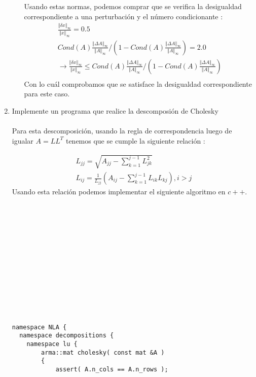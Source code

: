 \documentclass{article}
\begin{document}
\begin{enumerate}
\begin{itemize}
Usando estas normas, podemos comprar que se verifica la desigualdad correspondiente a una perturbaci\'on y el n\'umero condicionante :
\begin{gather*}
\frac{ \Vert \delta x \Vert_{\infty} }{\Vert x \Vert_{\infty}} = 0.5 \\
Cond(A) \frac{ \Vert \Delta A \Vert_{\infty} }{ \Vert A \Vert_{\infty} } /
( 1 - Cond(A) \frac{ \Vert \Delta A \Vert_{\infty} }{ \Vert A \Vert_{\infty} } 	) =  2.0 \\
\rightarrow 
\frac{ \Vert \delta x \Vert_{\infty} }{\Vert x \Vert_{\infty}}
\leq
Cond(A) \frac{ \Vert \Delta A \Vert_{\infty} }{ \Vert A \Vert_{\infty} } /
( 1 - Cond(A) \frac{ \Vert \Delta A \Vert_{\infty} }{ \Vert A \Vert_{\infty} } 	)\\
\end{gather*}
Con lo cu\'al comprobamos que se satisface la desigualdad correspondiente para este caso.
\\
\end{itemize}
\item Implemente un programa que realice la descomposi\'on de Cholesky
\\
\\
Para esta descomposici\'on, usando la regla de correspondencia luego de igualar 
$A = LL^{T}$ tenemos que se cumple la siguiente relaci\'on :

\begin{gather*}
L_{jj} = \sqrt{ A_{jj} - \sum_{k=1}^{j-1} L_{jk}^{2} } \\
L_{ij} = \frac{1}{L_{jj}}( A_{ij} - \sum_{k=1}^{j-1} L_{ik}L_{kj} ), i>j
\end{gather*}
Usando esta relaci\'on podemos implementar el siguiente algoritmo en $c++$.
\\
\\
\\
\\
\\
\\
\\
\\
\\
\\
\\
\\
\\
\lstset{language=C++}
\begin{lstlisting}[frame=single]
namespace NLA {
  namespace decompositions {
    namespace lu {
        arma::mat cholesky( const mat &A )
        {
            assert( A.n_cols == A.n_rows );


\end{lstlisting}
\end{enumerate}
\end{document}

